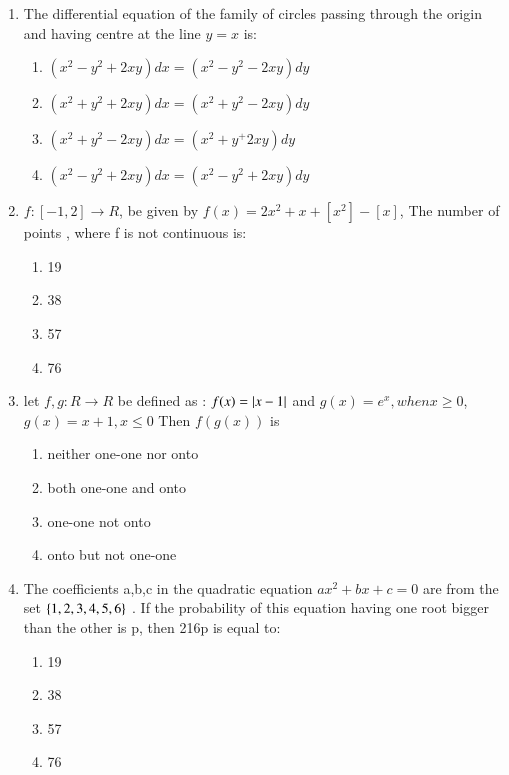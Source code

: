 \documentclass[journal]{IEEEtran}
\begin{document}
\begin{enumerate}
    

    \item The differential equation of the family of circles passing through the origin and having centre at the line $y=x$ is:
    \begin{multicols}{2}
            \begin{enumerate}
             \item $(x^2-y^2+2xy)dx=(x^2-y^2-2xy)dy$
              \item $(x^2+y^2+2xy)dx=(x^2+y^2-2xy)dy$
               \item $(x^2+y^2-2xy)dx=(x^2+y^+2xy)dy$
                \item $(x^2-y^2+2xy)dx=(x^2-y^2+2xy)dy$
            \end{enumerate}
        \end{multicols}
    \item $f:[-1,2]\rightarrow R$, be given by $f(x)=2x^2+x+[x^2]-[x]$, The number of points , where f is  not continuous is:
    \begin{multicols}{4}
            \begin{enumerate}
        
              \item 19
              \item 38
              \item 57
              \item 76
            \end{enumerate}
        \end{multicols}
    
    \item let $f,g: R\rightarrow R $ be defined as : $f(x)=\left\vert x-1\right\vert$ and $g(x)=e^x, when x\geq 0$,$g(x)=x+1, x\leq 0$ Then $f(g(x))$ is
    \begin{multicols}{2}
            \begin{enumerate}
              \item neither one-one nor onto
              \item both one-one and onto
              \item one-one not onto
              \item onto but not one-one
            \end{enumerate}
        \end{multicols}
        \item The coefficients a,b,c in the quadratic equation $ax^2+bx+c=0$ are from the set $\left\{1,2,3,4,5,6\right\}$ . If the probability of this equation having one root bigger than the other is p, then 216p is equal to:
        \begin{multicols}{4}
            \begin{enumerate}
              \item 19
              \item  38
              \item 57
              \item 76
            \end{enumerate}
        \end{multicols}
 \end{enumerate}
\end{document}

